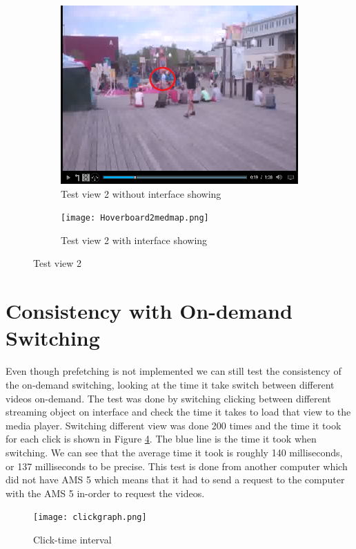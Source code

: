 \begin{figure}
\begin{subfigure}[b]{0.5\textwidth}
 	\includegraphics[width=\linewidth]{Hoverboard_2.png}
  	\caption{Test view 2 without interface showing}\label{fig:testview2A}
    \end{subfigure}\hfill 
    \hspace{3px}
    \begin{subfigure}[b]{0.5\textwidth}
	 \texttt{[image: Hoverboard2medmap.png]}
 	\caption{Test view 2 with interface showing}\label{fig:testview2B}
    \end{subfigure}
	\caption{Test view 2}
	\label{fig:testview2}
\end{figure}

\section{Consistency with On-demand Switching}
Even though prefetching is not implemented we can still test the consistency of the on-demand switching, looking at the time it take switch between different videos on-demand. The test was done by switching clicking between different streaming object on interface and check the time it takes to load that view to the media player. Switching different view was done 200 times and the time it took for each click is shown in Figure \ref{fig:clickgraph}. The blue line is the time it took when switching. We can see that the average time it took is roughly 140 milliseconds, or 137 milliseconds to be precise. This test is done from another computer which did not have AMS 5 which means that it had to send a request to the computer with the AMS 5 in-order to request the videos.


\begin{figure}[ht!]
\begin{center}
	\texttt{[image: clickgraph.png]}
	\caption{Click-time interval}
	\label{fig:clickgraph}
\end{center}
\end{figure}